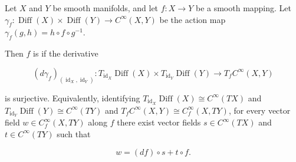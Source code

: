 Let $X$ and $Y$ be smooth manifolds, and let $f: X \to Y$ be a smooth mapping. Let $\gamma_f: \operatorname{Diff}(X) \times \operatorname{Diff}(Y) \to C^\infty(X, Y)$ be the action map $\gamma_f(g, h) = h \circ f \circ g^{-1}$.

Then $f$ is  if the derivative

$$
(d\gamma_f)_{(\operatorname{id}_X, \operatorname{id}_Y)}: T_{\operatorname{id}_X}\operatorname{Diff}(X) \times T_{\operatorname{id}_Y}\operatorname{Diff}(Y) \longrightarrow T_f C^\infty(X, Y)
$$

is surjective. Equivalently, identifying $T_{\operatorname{id}_X}\operatorname{Diff}(X) \cong C^\infty(TX)$ and $T_{\operatorname{id}_Y}\operatorname{Diff}(Y) \cong C^\infty(TY)$ and $T_f C^\infty(X, Y) \cong C_f^\infty(X, TY)$, for every vector field $w \in C_f^\infty(X, TY)$ along $f$ there exist vector fields $s \in C^\infty(TX)$ and $t \in C^\infty(TY)$ such that

$$
w = (df) \circ s + t \circ f.
$$
